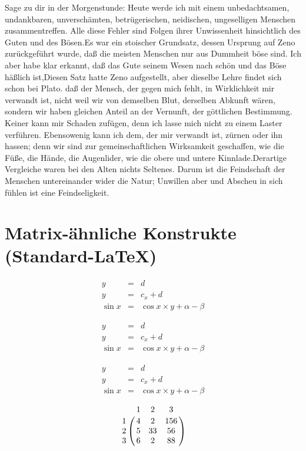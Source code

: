 \documentclass[12pt,ngerman,parskip=half]{scrartcl}
\begin{document}
Sage zu dir in der Morgenstunde: Heute werde ich mit einem unbedachtsamen, undankbaren, unverschämten, betrügerischen, neidischen, ungeselligen Menschen zusammentreffen. Alle diese Fehler sind Folgen ihrer Unwissenheit hinsichtlich des Guten und des Bösen.Es war ein stoischer Grundsatz, dessen Ursprung auf Zeno zurückgeführt wurde, daß die meisten Menschen nur aus Dummheit böse sind. Ich aber habe klar erkannt, daß das Gute seinem Wesen nach schön und das Böse häßlich ist,Diesen Satz hatte Zeno aufgestellt, aber dieselbe Lehre findet sich schon bei Plato. daß der Mensch, der gegen mich fehlt, in Wirklichkeit mir verwandt ist, nicht weil wir von demselben Blut, derselben Abkunft wären, sondern wir haben gleichen Anteil an der Vernunft, der göttlichen Bestimmung. Keiner kann mir Schaden zufügen, denn ich lasse mich nicht zu einem Laster verführen. Ebensowenig kann ich dem, der mir verwandt ist, zürnen oder ihn hassen; denn wir sind zur gemeinschaftlichen Wirksamkeit geschaffen, wie die Füße, die Hände, die Augenlider, wie die obere und untere Kinnlade.Derartige Vergleiche waren bei den Alten nichts Seltenes. Darum ist die Feindschaft der Menschen untereinander wider die Natur; Unwillen aber und Abscheu in sich fühlen ist eine Feindseligkeit.

\section{Matrix-ähnliche Konstrukte (Standard-LaTeX)}

\begin{eqnarray} %
y &=& d \\
y &=& c_x +d \\
\sin x &=& \cos x \times y + \alpha - \beta
\end{eqnarray}

\begin{eqnarray*} %
y &=& d \\
y &=& c_x +d \\
\sin x &=& \cos x \times y + \alpha - \beta
\end{eqnarray*}

\[
\begin{array}{lcr} %
y &=& d \\
y &=& c_x +d \\
\sin x &=& \cos x \times y + \alpha - \beta
\end{array}
\]

\[ %
\bordermatrix{
   & 1 & 2 & 3 \cr
1 & 4 & 2 & 156 \cr
2 & 5 & 33 & 56 \cr
3 & 6 & 2 & 88 \cr
}
\]
\end{document}

